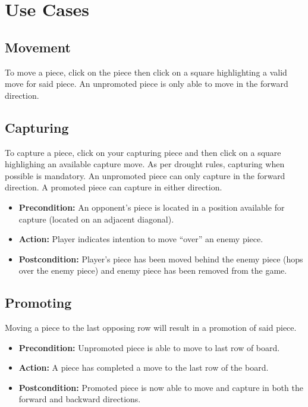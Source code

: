 \section{Use Cases}

\subsection{Movement}
To move a piece, click on the piece then click on a square highlighting a valid
move for said piece.  An unpromoted piece is only able to move in the forward
direction.

\subsection{Capturing}
To capture a piece, click on your capturing piece and then click on a square
highlighing an available capture move. As per drought rules, capturing when
possible is mandatory. An unpromoted piece can only capture in the forward
direction. A promoted piece can capture in either direction.
\begin{itemize}
  \item
    \textbf{Precondition:} An opponent's piece is located in a position
    available for capture (located on an adjacent diagonal).
  \item
    \textbf{Action:} Player indicates intention to move ``over'' an enemy
    piece.
  \item
    \textbf{Postcondition:} Player's piece has been moved behind the enemy
    piece (hops over the enemy piece) and enemy piece has been removed from the
    game.
\end{itemize}

\subsection{Promoting}
Moving a piece to the last opposing row will result in a promotion of said
piece.
\begin{itemize}
  \item
    \textbf{Precondition:} Unpromoted piece is able to move to last row of
    board.
  \item
    \textbf{Action:} A piece has completed a move to the last row of the board.
  \item
    \textbf{Postcondition:} Promoted piece is now able to move and capture in
    both the forward and backward directions.
\end{itemize}

